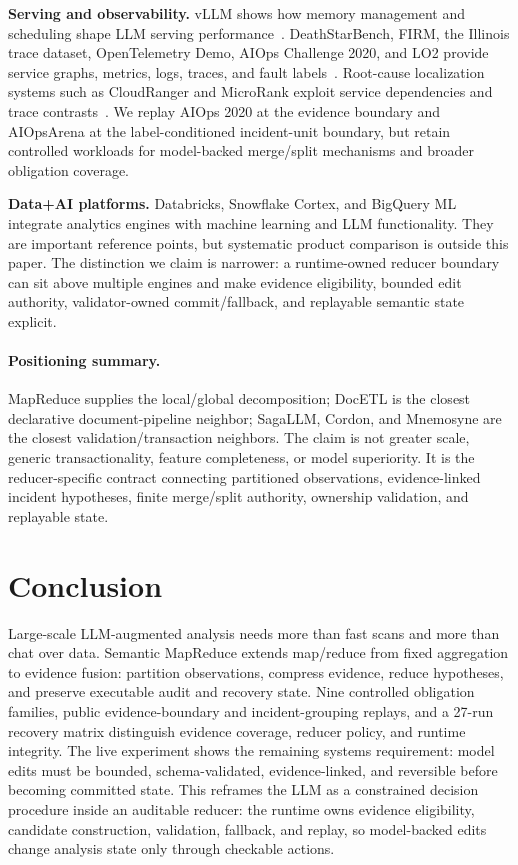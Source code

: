 \documentclass[sigplan,anonymous,nonacm]{acmart}
\newcommand{\systemname}{Semantic MapReduce}
\begin{document}
\textbf{Serving and observability.} vLLM shows how memory management and scheduling shape LLM serving performance~\cite{kwon2023vllm}. DeathStarBench, FIRM, the Illinois trace dataset, OpenTelemetry Demo, AIOps Challenge 2020, and LO2 provide service graphs, metrics, logs, traces, and fault labels~\cite{gan2019deathstarbench,qiu2020firm,qiu2020tracedataset,opentelemetry2026demo,netman2020aiopschallenge,bakhtin2025lo2}. Root-cause localization systems such as CloudRanger and MicroRank exploit service dependencies and trace contrasts~\cite{wang2018cloudranger,yu2021microrank}. We replay AIOps 2020 at the evidence boundary and AIOpsArena at the label-conditioned incident-unit boundary, but retain controlled workloads for model-backed merge/split mechanisms and broader obligation coverage.

\textbf{Data+AI platforms.} Databricks, Snowflake Cortex, and BigQuery ML integrate analytics engines with machine learning and LLM functionality. They are important reference points, but systematic product comparison is outside this paper. The distinction we claim is narrower: a runtime-owned reducer boundary can sit above multiple engines and make evidence eligibility, bounded edit authority, validator-owned commit/fallback, and replayable semantic state explicit.

\paragraph{Positioning summary.}

MapReduce supplies the local/global decomposition; DocETL is the closest declarative document-pipeline neighbor; SagaLLM, Cordon, and Mnemosyne are the closest validation/transaction neighbors. The claim is not greater scale, generic transactionality, feature completeness, or model superiority. It is the reducer-specific contract connecting partitioned observations, evidence-linked incident hypotheses, finite merge/split authority, ownership validation, and replayable state.

\section{Conclusion}

Large-scale LLM-augmented analysis needs more than fast scans and more than chat over data. \systemname{} extends map/reduce from fixed aggregation to evidence fusion: partition observations, compress evidence, reduce hypotheses, and preserve executable audit and recovery state. Nine controlled obligation families, public evidence-boundary and incident-grouping replays, and a 27-run recovery matrix distinguish evidence coverage, reducer policy, and runtime integrity. The live experiment shows the remaining systems requirement: model edits must be bounded, schema-validated, evidence-linked, and reversible before becoming committed state. This reframes the LLM as a constrained decision procedure inside an auditable reducer: the runtime owns evidence eligibility, candidate construction, validation, fallback, and replay, so model-backed edits change analysis state only through checkable actions.
\end{document}
